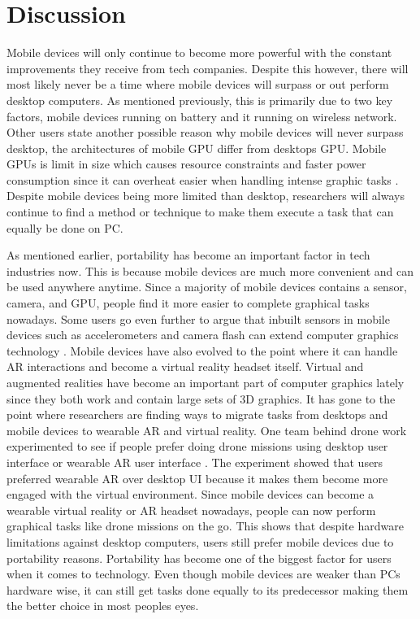 \documentclass{article}
\begin{document}
\section{Discussion}
   Mobile devices will only continue to become more powerful with the constant improvements they receive from tech companies. Despite this however, there will most likely never be a time where mobile devices will surpass or out perform desktop computers. As mentioned previously, this is primarily due to two key factors, mobile devices running on battery and it running on wireless network. Other users state another possible reason why mobile devices will never surpass desktop, the architectures of mobile GPU differ from desktops GPU. Mobile GPUs is limit in size which causes resource constraints and faster power consumption since it can overheat easier when handling intense graphic tasks \cite{10.1145/2503512.2503521}. Despite mobile devices being more limited than desktop, researchers will always continue to find a method or technique to make them execute a task that can equally be done on PC. 
   
   As mentioned earlier, portability has become an important factor in tech industries now. This is because mobile devices are much more convenient and can be used anywhere anytime. Since a majority of mobile devices contains a sensor, camera, and GPU, people find it more easier to complete graphical tasks nowadays. Some users go even further to argue that inbuilt sensors in mobile devices such as accelerometers and camera flash can extend computer graphics technology \cite{7030191}. Mobile devices have also evolved to the point where it can handle AR interactions and become a virtual reality headset itself. Virtual and augmented realities have become an important part of computer graphics lately since they both work and contain large sets of 3D graphics. It has gone to the point where researchers are finding ways to migrate tasks from desktops and mobile devices to wearable AR and virtual reality. One team behind drone work experimented to see if people prefer doing drone missions using desktop user interface or wearable AR user interface \cite{10.1145/3365610.3368420}. The experiment showed that users preferred wearable AR over desktop UI because it makes them become more engaged with the virtual environment. Since mobile devices can become a wearable virtual reality or AR headset nowadays, people can now perform graphical tasks like drone missions on the go. This shows that despite hardware limitations against desktop computers, users still prefer mobile devices due to portability reasons. Portability has become one of the biggest factor for users when it comes to technology. Even though mobile devices are weaker than PCs hardware wise, it can still get tasks done equally to its predecessor making them the better choice in most peoples eyes.
   
\end{document}
